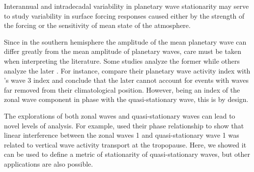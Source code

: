 \documentclass[draft,linenumbers]{agujournal2018}
\begin{document}
Interannual and intradecadal variability in planetary wave stationarity
may serve to study variability in surface forcing responses caused
either by the strength of the forcing or the sensitivity of mean state
of the atmosphere.

Since in the southern hemisphere the amplitude of the mean planetary
wave can differ greatly from the mean amplitude of planetary waves, care
must be taken when interpreting the literature. Some studies analyze the
former \citep[e.g.][\citet{Quintanar1995a},
\citet{Raphael2004}]{Loon1972} while others analyze the later
\citep[e.g.][\citet{Turner2017}, \citet{Irving2015}]{Rao2004}. For
instance, \citet{Irving2015} compare their planetary wave activity index
with \citet{Raphael2004}'s wave 3 index and conclude that the later
cannot account for events with waves far removed from their
climatological position. However, being an index of the zonal wave
component in phase with the quasi-stationary wave, this is by design.

The explorations of both zonal waves and quasi-stationary waves can lead
to novel levels of analysis. For example, \citet{Smith2012} used their
phase relationship to show that linear interference between the zonal
waves 1 and quasi-stationary wave 1 was related to vertical wave
activity transport at the tropopause. Here, we showed it can be used to
define a metric of stationarity of quasi-stationary waves, but other
applications are also possible.


\end{document}

